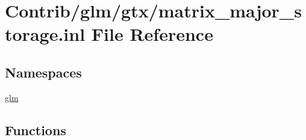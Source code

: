 \hypertarget{matrix__major__storage_8inl}{}\section{Contrib/glm/gtx/matrix\+\_\+major\+\_\+storage.inl File Reference}
\label{matrix__major__storage_8inl}
\subsection*{Namespaces}
\begin{DoxyCompactItemize}
\item 
 \mbox{\hyperlink{namespaceglm}{glm}}
\end{DoxyCompactItemize}
\subsection*{Functions}
